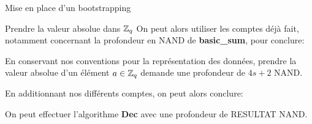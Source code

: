 \begin{section}{Mise en place d'un bootstrapping}
\begin{subsection}{Prendre la valeur absolue dans $\mathbb{Z}_q$}
On peut alors utiliser les comptes déjà fait, notamment concernant la
	profondeur en NAND de \textbf{basic\_sum}, pour conclure:
\begin{prop}
	En conservant nos conventions pour la représentation des données, prendre la valeur absolue
	d'un élément $a\in \mathbb{Z}_q$ demande une profondeur de $4s + 2$ NAND.
\end{prop}
\end{subsection}
En additionnant nos différents comptes, on peut alors conclure:

\begin{prop}
	On peut effectuer l'algorithme \textbf{Dec} avec une profondeur de
	RESULTAT NAND.
\end{prop}
	




\end{section}
